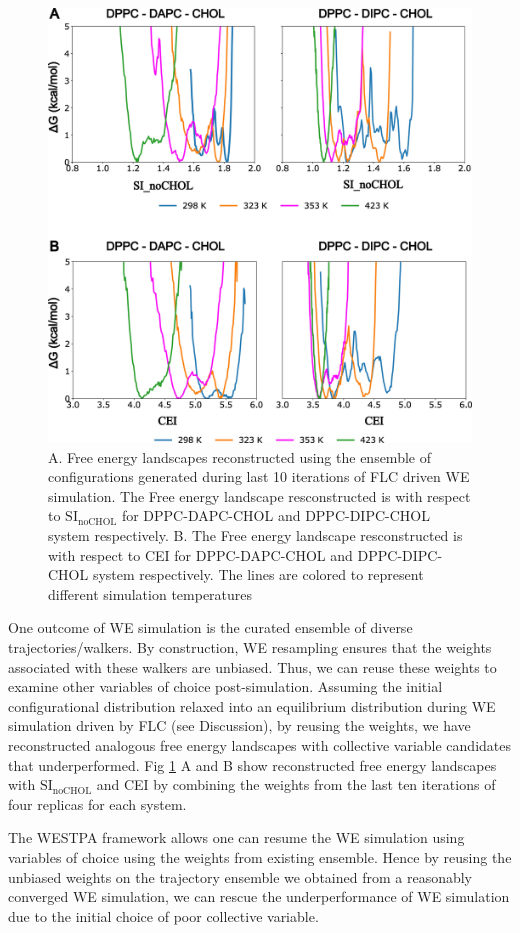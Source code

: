 \documentclass{biophys-new}
\begin{document}
\begin{figure}[hbt!]
\centering
\includegraphics[width=0.75\linewidth]{Figures/Main/6/placeholder.jpg}
\caption{A. Free energy landscapes reconstructed using the ensemble of configurations generated during last 10 iterations of FLC driven WE simulation. The Free energy landscape resconstructed is with respect to $\text{SI}_{\text{noCHOL}}$ for DPPC-DAPC-CHOL and DPPC-DIPC-CHOL system respectively. B. The Free energy landscape resconstructed is with respect to CEI for DPPC-DAPC-CHOL and DPPC-DIPC-CHOL system respectively. The lines are colored to represent different simulation temperatures}
\label{figs6:view}
\end{figure}

One outcome of WE simulation is the curated ensemble of diverse trajectories/walkers.
By construction, WE resampling ensures that the weights associated with these walkers are unbiased.
Thus, we can reuse these weights to examine other variables of choice post-simulation.
Assuming the initial configurational distribution relaxed into an equilibrium distribution during WE simulation driven by FLC (see Discussion), 
by reusing the weights, we have reconstructed analogous free energy landscapes with collective variable candidates that underperformed.
Fig \ref{figs6:view} A and B show reconstructed free energy landscapes with $\text{SI}_{\text{noCHOL}}$ and CEI by combining the weights from the last ten iterations of four replicas for each system.

The WESTPA framework allows one can resume the WE simulation using variables of choice using the weights from existing ensemble\cite{Zhang2010, Zwier2015}.
Hence by reusing the unbiased weights on the trajectory ensemble we obtained from a reasonably converged WE simulation,
we can rescue the underperformance of WE simulation due to the initial choice of poor collective variable.
\end{document}
